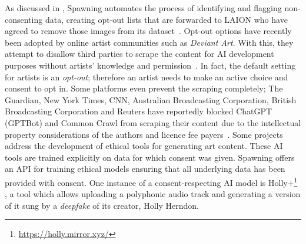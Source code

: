 \documentclass[conference,table]{IEEEtran} %
\begin{document}
As discussed in , Spawning automates the process of identifying and flagging non-consenting data, creating opt-out lists that are forwarded to LAION who have agreed to remove those images from its dataset~\cite{wu_how_2023}.
Opt-out options have recently been adopted by online artist communities such as \textit{Deviant Art}. 
With this, they attempt to disallow third parties to scrape the content for AI development purposes without artists' knowledge and permission~\cite{wiggers_deviantart_2022}. 
In fact, the default setting for artists is an \textit{opt-out}; therefore an artist needs to make an active choice and consent to opt in. 
Some platforms even prevent the scraping completely; The Guardian, New York Times, CNN, Australian Broadcasting Corporation, British Broadcasting Corporation and Reuters have reportedly blocked ChatGPT (GPTBot) and Common Crawl from scraping their content due to the intellectual property considerations of the authors and licence fee payers~\cite{bogle_new_2023,marcus_generative_2024}.
Some projects address the development of ethical tools for generating art content. 
These AI tools are trained explicitly on data for which consent was given.
Spawning offers an API for training ethical models ensuring that all underlying data has been provided with consent.
One instance of a consent-respecting AI model is Holly+\footnote{\href{https://holly.mirror.xyz/54ds2IiOnvthjGFkokFCoaI4EabytH9xjAYy1irHy94}{https://holly.mirror.xyz/}}%
, a tool which allows uploading a polyphonic audio track and generating a version of it sung by a \textit{deepfake} of its creator, Holly Herndon.
\end{document}
